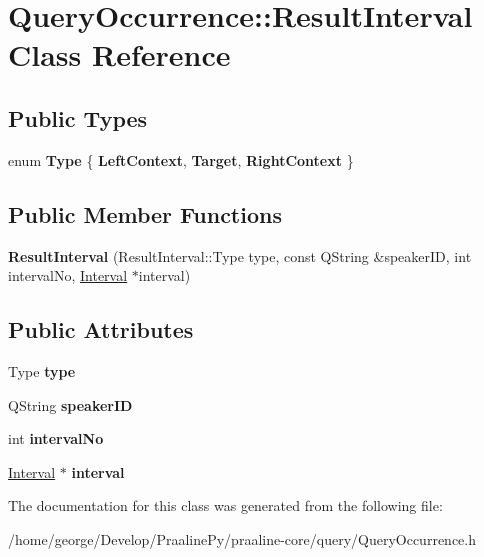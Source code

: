 \hypertarget{class_query_occurrence_1_1_result_interval}{}\section{Query\+Occurrence\+:\+:Result\+Interval Class Reference}
\label{class_query_occurrence_1_1_result_interval}
\subsection*{Public Types}
\begin{DoxyCompactItemize}
\item 
\mbox{\label{class_query_occurrence_1_1_result_interval_a7d124bfc1dea4489c1e11de0d88f3c00}} 
enum {\bfseries Type} \{ {\bfseries Left\+Context}, 
{\bfseries Target}, 
{\bfseries Right\+Context}
 \}
\end{DoxyCompactItemize}
\subsection*{Public Member Functions}
\begin{DoxyCompactItemize}
\item 
\mbox{\label{class_query_occurrence_1_1_result_interval_a485fcf31c1266c2917f2f42d83cc7c3b}} 
{\bfseries Result\+Interval} (Result\+Interval\+::\+Type type, const Q\+String \&speaker\+ID, int interval\+No, \hyperlink{class_interval}{Interval} $\ast$interval)
\end{DoxyCompactItemize}
\subsection*{Public Attributes}
\begin{DoxyCompactItemize}
\item 
\mbox{\label{class_query_occurrence_1_1_result_interval_a7e2a6509e625bf34a18a77fdc1336b3d}} 
Type {\bfseries type}
\item 
\mbox{\label{class_query_occurrence_1_1_result_interval_a227bce8667eca850b0bf1230a0d1dc73}} 
Q\+String {\bfseries speaker\+ID}
\item 
\mbox{\label{class_query_occurrence_1_1_result_interval_add4e6765931766480bf1a62956ae48f3}} 
int {\bfseries interval\+No}
\item 
\mbox{\label{class_query_occurrence_1_1_result_interval_ad8d73e4a9ba7adac3f887b0d0e3527c9}} 
\hyperlink{class_interval}{Interval} $\ast$ {\bfseries interval}
\end{DoxyCompactItemize}


The documentation for this class was generated from the following file\+:\begin{DoxyCompactItemize}
\item 
/home/george/\+Develop/\+Praaline\+Py/praaline-\/core/query/Query\+Occurrence.\+h\end{DoxyCompactItemize}
